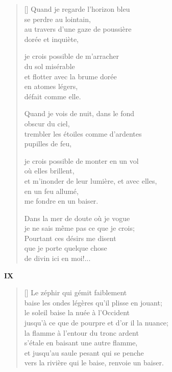 \documentclass[a4paper,12pt]{book}
\begin{document}
\begin{verse}[\versewidth]
  Quand je regarde l'horizon bleu \\
  se perdre au lointain, \\
  au travers d'une gaze de poussière \\
  dorée et inquiète,

  je crois possible de m'arracher \\
  du sol misérable \\
  et flotter avec la brume dorée \\
  en atomes légers, \\
  défait comme elle. %

  Quand je vois de nuit, dans le fond \\
  obscur du ciel, \\
  trembler les étoiles comme d'ardentes \\
  pupilles de feu,

  je crois possible de monter en un vol \\ %
  où elles brillent, \\
  et m'inonder de leur lumière, et avec elles, \\
  en un feu allumé, \\
  me fondre en un baiser.

  Dans la mer de doute où je vogue \\
  je ne sais même pas ce que je crois; \\
  Pourtant ces désirs me disent \\
  que je porte quelque chose \\
  de divin ici en moi!... %
\end{verse}

\bigskip

\begin{center}
  \textbf{IX}
\end{center}

\settowidth{\versewidth}{jusqu'à ce que de pourpre et d'or il la nuance;}

\begin{verse}[\versewidth]
  Le zéphir qui gémit faiblement \\
  baise les ondes légères qu'il plisse en jouant; \\
  le soleil baise la nuée à l'Occident \\
  jusqu'à ce que de pourpre et d'or il la nuance; \\
  la flamme à l'entour du tronc ardent \\
  s'étale en baisant une autre flamme, \\
  et jusqu'au saule pesant qui se penche \\
  vers la rivière qui le baise, renvoie un baiser.
\end{verse}
\end{document}

